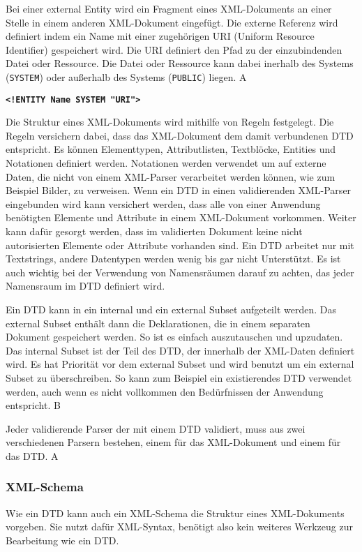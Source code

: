 Bei einer external Entity wird ein Fragment eines XML-Dokuments an einer Stelle in einem anderen XML-Dokument eingefügt. Die externe Referenz wird definiert indem ein Name mit einer zugehörigen URI (Uniform Resource Identifier) gespeichert wird. Die URI definiert den Pfad zu der einzubindenden Datei oder Ressource. Die Datei oder Ressource kann dabei inerhalb des Systems (\texttt{SYSTEM}) oder außerhalb des Systems (\texttt{PUBLIC}) liegen. A

\tabto{1.5cm}\texttt{\textbf{<!ENTITY Name SYSTEM "{}URI"{}> }}

Die Struktur eines XML-Dokuments wird mithilfe von Regeln festgelegt. Die Regeln versichern dabei, dass das XML-Dokument dem damit verbundenen DTD entspricht. Es können Elementtypen, Attributlisten, Textblöcke, Entities und Notationen definiert werden. Notationen werden verwendet um auf externe Daten, die nicht von einem XML-Parser verarbeitet werden können, wie zum Beispiel Bilder, zu verweisen. Wenn ein DTD in einen validierenden XML-Parser eingebunden wird kann versichert werden, dass alle von einer Anwendung benötigten Elemente und Attribute in einem XML-Dokument vorkommen. Weiter kann dafür gesorgt werden, dass im validierten Dokument keine nicht autorisierten Elemente oder Attribute vorhanden sind. Ein DTD arbeitet nur mit Textstrings, andere Datentypen werden wenig bis gar nicht Unterstützt. Es ist auch wichtig bei der Verwendung von Namensräumen darauf zu achten, das jeder Namensraum im DTD definiert wird.

Ein DTD kann in ein internal und ein external Subset aufgeteilt werden. Das external Subset enthält dann die Deklarationen, die in einem separaten Dokument gespeichert werden. So ist es einfach auszutauschen und upzudaten. Das internal Subset ist der Teil des DTD, der innerhalb der XML-Daten definiert wird. Es hat Priorität vor dem external Subset und wird benutzt um ein external Subset zu überschreiben. So kann zum Beispiel ein existierendes DTD verwendet werden, auch wenn es nicht vollkommen den Bedürfnissen der Anwendung entspricht. B

Jeder validierende Parser der mit einem DTD validiert, muss aus zwei verschiedenen Parsern bestehen, einem für das XML-Dokument und einem für das DTD. A

\subsubsection{XML-Schema}

Wie ein DTD kann auch ein XML-Schema die Struktur eines XML-Dokuments vorgeben. Sie nutzt dafür XML-Syntax, benötigt also kein weiteres Werkzeug zur Bearbeitung wie ein DTD. 

